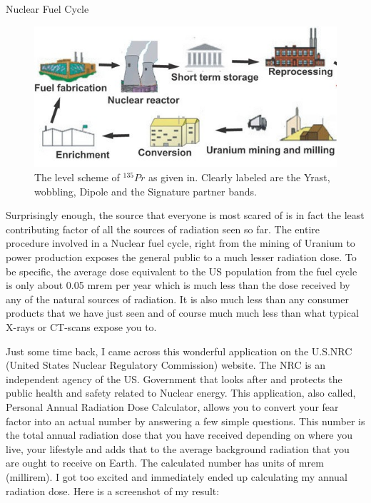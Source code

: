 \documentclass[%
 amsmath,amssymb,
]{article}
\begin{document}
\begin{section}{Nuclear Fuel Cycle}
\begin{figure}
\begin{center}
\includegraphics[width = \textwidth]{nuke-cycle}
\caption{The level scheme of $^{135}Pr$ as given in. Clearly labeled are the Yrast, wobbling, Dipole and the Signature partner bands.}
\end{center}
\end{figure}

Surprisingly enough, the source that everyone is most scared of is in fact the least contributing factor  of all the sources of radiation seen so far.  The entire procedure involved in a Nuclear fuel cycle, right from the mining of Uranium to power production exposes the general public to a much lesser radiation dose. To be specific, the average dose equivalent to the US population from the fuel cycle is only about 0.05 mrem per year which is much less than the dose received by any of the natural sources of radiation. It is also much less than any consumer products that we have just seen and of course much much less than what typical X-rays or CT-scans expose you to. 

\end{section}

Just some time back, I came across this wonderful application on the U.S.NRC (United States Nuclear Regulatory Commission) website. The NRC is an independent agency of the US. Government that looks after and protects the public health and safety related to Nuclear energy. This application, also called, Personal Annual Radiation Dose Calculator, allows you to convert your fear factor into an actual number by answering a few simple questions. This number is the total annual radiation dose that you have received depending on where you live, your lifestyle and adds that to the average background radiation that you are ought to receive on Earth. The calculated number has units of mrem (millirem). I got too excited and immediately ended up calculating my annual radiation dose. Here is a screenshot of my result:
\end{document}

